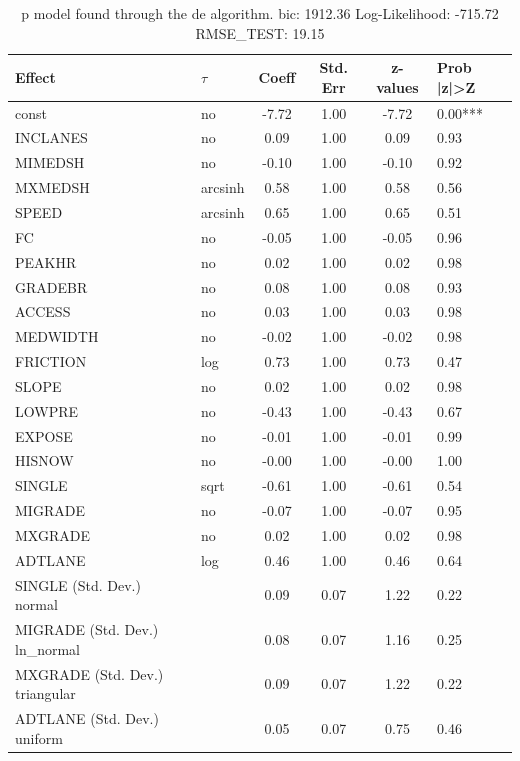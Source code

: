 \begin{table}
	\caption{p model found through the de algorithm. bic: 1912.36 Log-Likelihood: -715.72 RMSE_TEST: 19.15}
	\begin{center}
		\begin{tabular}{|l|l|c|c|c|l|}
			\hline
			Effect & $\tau$ & Coeff & Std. Err & z-values & Prob |z|>Z \\
			\hline
			const & no & -7.72 & 1.00 & -7.72 & 0.00*** \\
			\hline
			INCLANES & no & 0.09 & 1.00 & 0.09 & 0.93 \\
			\hline
			MIMEDSH & no & -0.10 & 1.00 & -0.10 & 0.92 \\
			\hline
			MXMEDSH & arcsinh & 0.58 & 1.00 & 0.58 & 0.56 \\
			\hline
			SPEED & arcsinh & 0.65 & 1.00 & 0.65 & 0.51 \\
			\hline
			FC & no & -0.05 & 1.00 & -0.05 & 0.96 \\
			\hline
			PEAKHR & no & 0.02 & 1.00 & 0.02 & 0.98 \\
			\hline
			GRADEBR & no & 0.08 & 1.00 & 0.08 & 0.93 \\
			\hline
			ACCESS & no & 0.03 & 1.00 & 0.03 & 0.98 \\
			\hline
			MEDWIDTH & no & -0.02 & 1.00 & -0.02 & 0.98 \\
			\hline
			FRICTION & log & 0.73 & 1.00 & 0.73 & 0.47 \\
			\hline
			SLOPE & no & 0.02 & 1.00 & 0.02 & 0.98 \\
			\hline
			LOWPRE & no & -0.43 & 1.00 & -0.43 & 0.67 \\
			\hline
			EXPOSE & no & -0.01 & 1.00 & -0.01 & 0.99 \\
			\hline
			HISNOW & no & -0.00 & 1.00 & -0.00 & 1.00 \\
			\hline
			SINGLE & sqrt & -0.61 & 1.00 & -0.61 & 0.54 \\
			\hline
			MIGRADE & no & -0.07 & 1.00 & -0.07 & 0.95 \\
			\hline
			MXGRADE & no & 0.02 & 1.00 & 0.02 & 0.98 \\
			\hline
			ADTLANE & log & 0.46 & 1.00 & 0.46 & 0.64 \\
			\hline
			SINGLE (Std. Dev.) normal &  & 0.09 & 0.07 & 1.22 & 0.22 \\
			\hline
			MIGRADE (Std. Dev.) ln_normal &  & 0.08 & 0.07 & 1.16 & 0.25 \\
			\hline
			MXGRADE (Std. Dev.) triangular &  & 0.09 & 0.07 & 1.22 & 0.22 \\
			\hline
			ADTLANE (Std. Dev.) uniform &  & 0.05 & 0.07 & 0.75 & 0.46 \\
			\hline
		\end{tabular}
	\end{center}
\end{table}